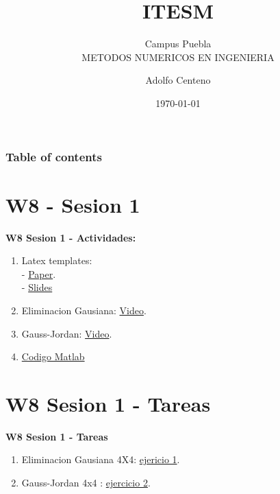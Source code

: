 \documentclass{beamer}
\begin{document}
\title{ITESM}  
\subtitle{Campus Puebla\\METODOS NUMERICOS EN INGENIERIA
}
\author{Adolfo Centeno}
\date{\today} 


\begin{frame}
\titlepage
\end{frame}

\begin{frame}\frametitle{Table of contents}
\tableofcontents
\end{frame} 


\section{W8 - Sesion 1 }

\begin{frame}

\textbf{W8 Sesion 1 - Actividades:}

\begin{enumerate}
\item
    Latex templates:  \\
    - \href{https://miktex.org/download}{Paper}. \\
    - \href{https://github.com/adsoftsito/metodos-numericos/blob/master/w8/semana8_sesion1.tex}{Slides} 
\item
	Eliminacion Gausiana: \href{https://www.youtube.com/watch?v=XRcx8-2lLJI}{Video}.	
\item
	Gauss-Jordan: \href{https://www.youtube.com/watch?v=pUabaQqbrug}{Video}.	
\item
	\href{https://github.com/adsoftsito/metodos-numericos/blob/master/w8/eliminaciongausiana/eliminaciongausian.m}{Codigo Matlab} 

	

\end{enumerate} 

\end{frame}


\section{W8 Sesion 1 - Tareas }

\begin{frame}


\textbf{W8 Sesion 1 - Tareas}


\begin{enumerate}
\item
	Eliminacion Gausiana 4X4: \href{https://www.youtube.com/watch?v=uL3JwFy9BWA}{ejericio 1}.	
\item
	Gauss-Jordan 4x4 : \href{https://www.youtube.com/watch?v=uL3JwFy9BWA&t=497s}{ejercicio 2}.	

\end{enumerate} 


\end{frame}
\end{document}

